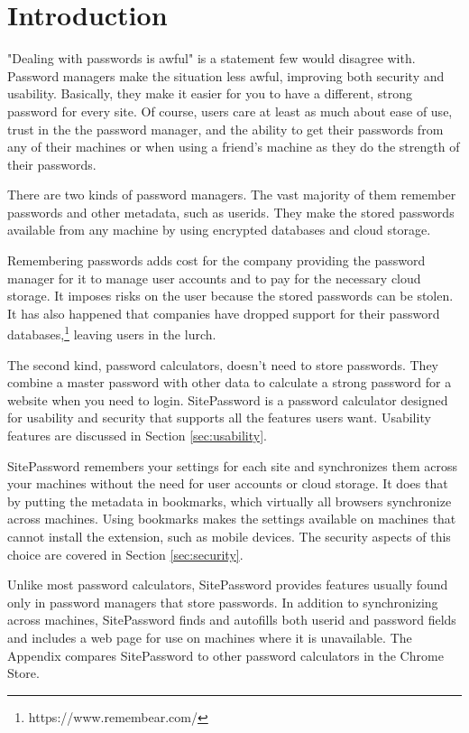 \section{Introduction}\label{intro}

"Dealing with passwords is awful" is a statement few would disagree with.  Password managers make the situation less awful, improving both security and usability.  Basically, they make it easier for you to have a different, strong password for every site.  Of course, users care at least as much about ease of use, trust in the the password manager, and the ability to get their passwords from any of their machines or when using a friend's machine as they do the strength of their passwords.

There are two kinds of password managers.  The vast majority of them remember passwords and other metadata, such as userids.   They  make the stored passwords available from any machine by using  encrypted databases and cloud storage.

Remembering passwords adds cost for the company providing the password manager for it to manage user accounts and to pay for the necessary cloud storage.  It imposes risks on the user because the stored passwords can be stolen.  It has also happened that companies have dropped support for their password databases,\footnote{https://www.remembear.com/} leaving users in the lurch.

The second kind, password calculators, doesn't need to store passwords.  They combine a master password with other data to calculate a strong password for a website when you need to login.  SitePassword is a password calculator designed for usability and security that supports all the features users want.  Usability features are discussed in Section \ref{sec:usability}.

SitePassword remembers your settings for each site and synchronizes them across your machines without the need for user accounts or cloud storage.  It does that by putting the metadata in bookmarks, which virtually all browsers synchronize across machines.  Using bookmarks makes the settings available on machines that cannot install the extension, such as mobile devices. The security aspects of this choice are covered in Section \ref{sec:security}.

Unlike most password calculators, SitePassword provides features usually found only in password managers that store passwords.  In addition to synchronizing across machines, SitePassword finds and autofills both userid and password fields and includes a web page for use on machines where it is unavailable.  The Appendix compares SitePassword to other password calculators in the Chrome Store.

